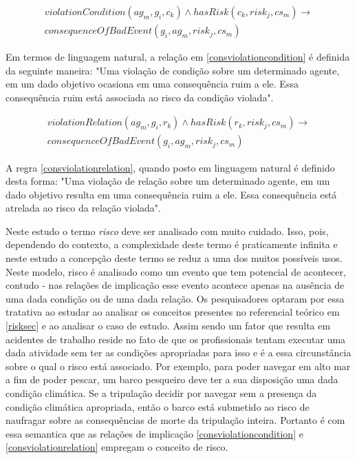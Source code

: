 \begin{eqnarray}\label{consviolationcondition}\nonumber
	violationCondition(ag_m,g_i,c_k)  \wedge hasRisk(c_k,risk_j,cs_m) \to \\ 
	consequenceOfBadEvent(g_i,ag_m,risk_j,cs_m)
\end{eqnarray}

Em termos de linguagem natural, a relação em \ref{consviolationcondition} é definida da seguinte maneira: "Uma violação de condição sobre um determinado 
agente, em um dado objetivo ocasiona em uma consequência ruim a ele. Essa consequência ruim está associada ao risco da condição violada". 

\begin{eqnarray}\label{consviolationrelation}\nonumber
	violationRelation(ag_m,g_i,r_k) \wedge hasRisk(r_k,risk_j,cs_m) \to \\ 
	consequenceOfBadEvent(g_i,ag_m,risk_j,cs_m)
\end{eqnarray}

A regra \ref{consviolationrelation}, quando posto em linguagem natural é definido desta forma: "Uma violação de relação sobre um determinado agente, 
em um dado objetivo resulta em uma consequência ruim a ele. Essa consequência está atrelada ao risco da relação violada". 

Neste estudo o termo \textit{risco} deve ser analisado com muito cuidado. Isso, pois, dependendo do contexto, a complexidade deste termo é praticamente 
infinita e neste estudo a concepção deste termo se reduz a uma dos muitos possíveis usos. Neste modelo, risco é analisado como um evento que tem potencial 
de acontecer, contudo - nas relações de implicação esse evento acontece apenas na ausência de uma dada condição ou de uma dada relação. Os pesquisadores 
optaram por essa tratativa ao estudar ao analisar os conceitos presentes no referencial teórico em \ref{risksec} e ao analisar o caso de estudo. Assim sendo 
um fator que resulta em acidentes de trabalho reside no fato de que os profissionais tentam executar uma dada atividade sem ter as condições apropriadas 
para isso e é a essa circunstância sobre o qual o risco está associado. Por exemplo, para poder navegar em alto mar a fim de poder pescar, um barco 
pesqueiro deve ter a sua disposição uma dada condição climática. Se a tripulação decidir por navegar sem a presença da condição climática apropriada, 
então o barco está submetido ao risco de naufragar sobre as consequências de morte da tripulação inteira. Portanto é com essa semantica que as relações 
de implicação \ref{consviolationcondition} e \ref{consviolationrelation} empregam o conceito de risco. 

